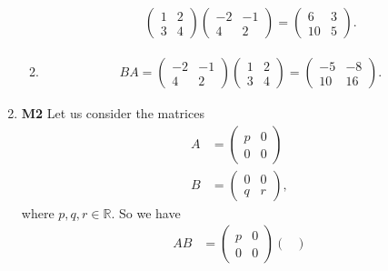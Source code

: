 \documentclass[12pt,oneside]{book}
\begin{document}
\begin{enumerate}
\begin{enumerate}
\begin{align*}
\begin{pmatrix}
                    1 & 2 \\
                    3 & 4
                \end{pmatrix} \begin{pmatrix} 
                    -2 & -1 \\
                    4 & 2
                \end{pmatrix} = \begin{pmatrix} 
                    6 & 3 \\
                    10 & 5
                \end{pmatrix}.
            \end{align*}
            \item \begin{align*}
                BA = \begin{pmatrix} 
                    -2 & -1 \\
                    4 & 2
                \end{pmatrix} \begin{pmatrix} 
                    1 & 2 \\
                    3 & 4
                \end{pmatrix} = \begin{pmatrix} 
                    -5 & -8 \\
                    10 & 16
                \end{pmatrix}.
            \end{align*}
        \end{enumerate}
        \item \textbf{M2} Let us consider the matrices \begin{align*}
            A &= \begin{pmatrix} p & 0 \\ 0 & 0 \end{pmatrix} \\
            B &= \begin{pmatrix} 0 & 0 \\ q & r \end{pmatrix},
        \end{align*}
        where $p, q, r \in \mathbb{R}$. So we have \begin{align*}
            AB &= \begin{pmatrix} 
                p & 0 \\ 
                0 & 0 
            \end{pmatrix} \begin{pmatrix} 

\end{pmatrix}
\end{align*}
\end{enumerate}
\end{document}
